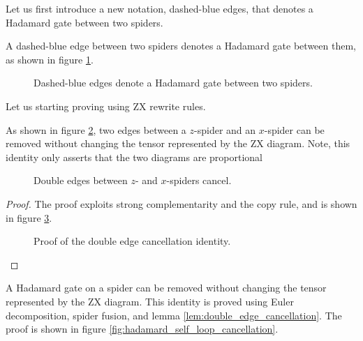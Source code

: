 Let us first introduce a new notation, dashed-blue edges, that denotes a Hadamard gate between two spiders.

\begin{definition}
	A dashed-blue edge between two spiders denotes a Hadamard gate between them, as shown in figure \ref{fig:dashed_blue_edge}.
\end{definition}

\begin{figure}[ht]
	\centering
	
	\caption{Dashed-blue edges denote a Hadamard gate between two spiders.}
	\label{fig:dashed_blue_edge}
\end{figure}

Let us starting proving using ZX rewrite rules.

\begin{lemma}\label{lem:double_edge_cancellation}
	As shown in figure \ref{fig:double_edge_cancellation}, two edges between a $z$-spider and an $x$-spider can be removed without changing the tensor represented by the ZX diagram.
	Note, this identity only asserts that the two diagrams are proportional
	\begin{figure}
		\centering 
		\caption{Double edges between $z$- and $x$-spiders cancel.} 
   	    
		\label{fig:double_edge_cancellation}
	\end{figure}
\end{lemma}


\begin{proof}
	The proof exploits strong complementarity and the copy rule, and is shown in figure \ref{eq:proof-cancellation}.

	\begin{figure}
		\centering
		\resizebox{\linewidth}{!}{
			
		}
		\caption{Proof of the double edge cancellation identity.}
		\label{eq:proof-cancellation}
	\end{figure}
\end{proof}

\begin{lemma}\label{lem:hadamard_self_loop_cancellation}
	A Hadamard gate on a spider can be removed without changing the tensor represented by the ZX diagram.
	This identity is proved using Euler decomposition, spider fusion, and lemma \ref{lem:double_edge_cancellation}. The proof is shown in figure \ref{fig:hadamard_self_loop_cancellation}.
\end{lemma}

